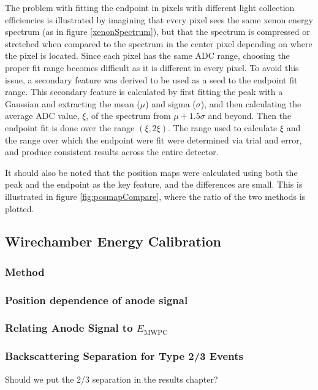 The problem with fitting the endpoint in pixels with different light collection efficiencies is illustrated by
imagining that every pixel sees the same xenon energy spectrum (as in figure \ref{xenonSpectrum}), but that
the spectrum is compressed or stretched when compared to the spectrum in the center pixel depending on where
the pixel is located. Since each pixel has the same ADC range, choosing the proper fit range becomes difficult
as it is different in every pixel. To avoid this issue, a secondary feature was derived to be used as a
seed to the endpoint fit range. This secondary feature is calculated by first fitting the peak with a Gaussian
and extracting the mean ($\mu$) and sigma ($\sigma$), and then calculating the average ADC value, $\xi$, of the spectrum
from $\mu+1.5\sigma$ and beyond. Then the endpoint fit is done over the range $(\xi,2\xi)$. The range used to
calculate $\xi$ and the range over which the endpoint were fit were determined via trial and error, and produce
consistent results across the entire detector.

It should also be noted that the position maps were calculated using both the peak and the endpoint as the key
feature, and the differences are small. This is illustrated in figure \ref{fig:posmapCompare}, where the
ratio of the two methods is plotted.



\subsection{Wirechamber Energy Calibration}

\subsubsection{Method}

\subsubsection{Position dependence of anode signal}

\subsubsection{Relating Anode Signal to $E_{\mathrm{MWPC}}$}

\subsubsection{Backscattering Separation for Type 2/3 Events}
Should we put the 2/3 separation in the results chapter?


